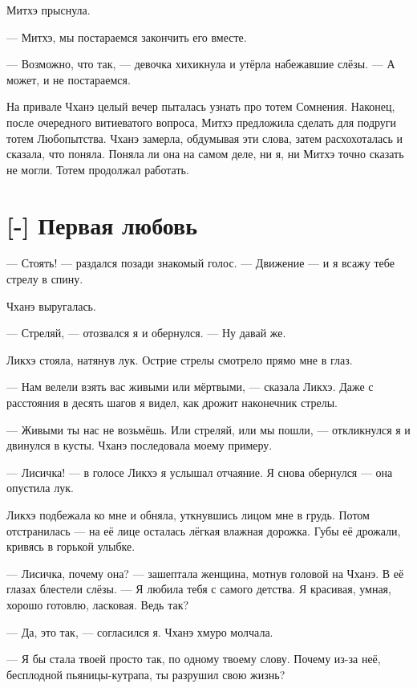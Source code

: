 Митхэ прыснула.

--- Митхэ, мы постараемся закончить его вместе.

--- Возможно, что так, --- девочка хихикнула и утёрла набежавшие слёзы.
--- А может, и не постараемся.

\asterism

На привале Чханэ целый вечер пыталась узнать про тотем Сомнения.
Наконец, после очередного витиеватого вопроса, Митхэ предложила сделать для подруги тотем Любопытства.
Чханэ замерла, обдумывая эти слова, затем расхохоталась и сказала, что поняла.
Поняла ли она на самом деле, ни я, ни Митхэ точно сказать не могли.
Тотем продолжал работать.

\section{[-] Первая любовь}

\textspace

--- Стоять! --- раздался позади знакомый голос.
--- Движение --- и я всажу тебе стрелу в спину.

Чханэ выругалась.

--- Стреляй, --- отозвался я и обернулся.
--- Ну давай же.

Ликхэ стояла, натянув лук.
Острие стрелы смотрело прямо мне в глаз.

--- Нам велели взять вас живыми или мёртвыми, --- сказала Ликхэ.
Даже с расстояния в десять шагов я видел, как дрожит наконечник стрелы.

--- Живыми ты нас не возьмёшь.
Или стреляй, или мы пошли, --- откликнулся я и двинулся в кусты.
Чханэ последовала моему примеру.

--- Лисичка! --- в голосе Ликхэ я услышал отчаяние.
Я снова обернулся --- она опустила лук.

Ликхэ подбежала ко мне и обняла, уткнувшись лицом мне в грудь.
Потом отстранилась --- на её лице осталась лёгкая влажная дорожка.
Губы её дрожали, кривясь в горькой улыбке.

--- Лисичка, почему она? --- зашептала женщина, мотнув головой на Чханэ.
В её глазах блестели слёзы.
--- Я любила тебя с самого детства.
Я красивая, умная, хорошо готовлю, ласковая.
Ведь так?

--- Да, это так, --- согласился я.
Чханэ хмуро молчала.

--- Я бы стала твоей просто так, по одному твоему слову.
Почему из-за неё, бесплодной пьяницы-кутрапа, ты разрушил свою жизнь?

